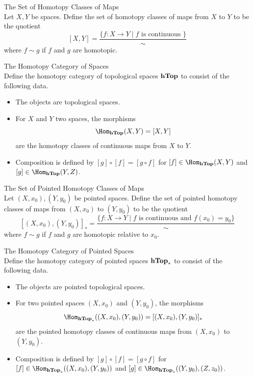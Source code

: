 \documentclass[a4paper]{article}
\begin{document}
\begin{defn}{The Set of Homotopy Classes of Maps}{}\\
Let $X,Y$ be spaces. Define the set of homotopy classes of maps from $X$ to $Y$ to be the quotient $$[X,Y]=\frac{\{f:X\to Y\;|\;f\text{ is continuous }\}}{\sim}$$ where $f\sim g$ if $f$ and $g$ are homotopic. 
\end{defn}

\begin{defn}{The Homotopy Category of Spaces}{}\\
Define the homotopy category of topological spaces $\bold{hTop}$ to consist of the following data. 
\begin{itemize}
\item The objects are topological spaces. 
\item For $X$ and $Y$ two spaces, the morphisms $$\Hom_{\bold{hTop}}(X,Y)=[X,Y]$$ are the homotopy classes of continuous maps from $X$ to $Y$. 
\item Composition is defined by $[g]\circ[f]=[g\circ f]$ for $[f]\in\Hom_{\bold{hTop}}(X,Y)$ and $[g]\in\Hom_{\bold{hTop}}(Y,Z)$. 
\end{itemize}
\end{defn}

\begin{defn}{The Set of Pointed Homotopy Classes of Maps}{}\\
Let $(X,x_0),(Y,y_0)$ be pointed spaces. Define the set of pointed homotopy classes of maps from $(X,x_0)$ to $(Y,y_0)$ to be the quotient $$[(X,x_0),(Y,y_0)]_\ast=\frac{\{f:X\to Y\;|\;f\text{ is continuous and }f(x_0)=y_0\}}{\sim}$$ where $f\sim g$ if $f$ and $g$ are homotopic relative to $x_0$. 
\end{defn}

\begin{defn}{The Homotopy Category of Pointed Spaces}{}\\
Define the homotopy category of pointed spaces $\bold{hTop}_\ast$ to consist of the following data. 
\begin{itemize}
\item The objects are pointed topological spaces. 
\item For two pointed spaces $(X,x_0)$ and $(Y,y_0)$, the morphisms $$\Hom_{\bold{hTop}_\ast}((X,x_0),(Y,y_0))=[(X,x_0),(Y,y_0)]_\ast$$ are the pointed homotopy classes of continuous maps from $(X,x_0)$ to $(Y,y_0)$. 
\item Composition is defined by $[g]\circ[f]=[g\circ f]$ for $[f]\in\Hom_{\bold{hTop}_\ast}((X,x_0),(Y,y_0))$ and $[g]\in\Hom_{\bold{hTop}_\ast}((Y,y_0),(Z,z_0))$. 
\end{itemize}
\end{defn}
\end{document}
